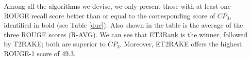 \documentclass[a4paper,twoside]{article}
\begin{document}
Among all the algorithms we devise, we only present those with at least one ROUGE recall score better than or equal to the corresponding score of $CP_3$, %
identified in bold %
(see Table \ref{duc}).
Also shown in the table is the average of the three ROUGE scores (R-AVG). We can see that
ET3Rank is the winner, followed by T2RAKE; both are superior to $CP_3$.
Moreover, ET2RAKE offers the highest
ROUGE-1 score of 49.3.
%
%
\end{document}
